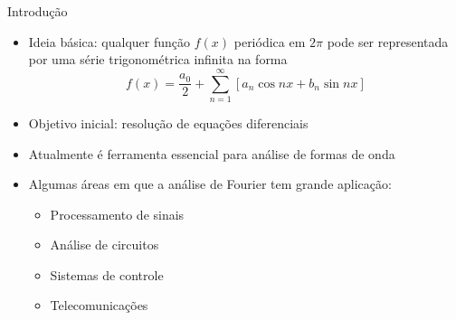       \begin{slide}[toc =]{Introdução}
	      \begin{itemize}
		      \item Ideia básica: qualquer função $f(x)$ periódica em $2\pi$ pode ser representada por uma série trigonométrica infinita na forma
			      \begin{equation*}
				      f(x) = \frac{a_0}{2}+ \sum_{n=1}^\infty \left [ a_n\cos nx + b_n\sin nx\right ]
			      \end{equation*}\pause	
		      \item Objetivo inicial: resolução de equações diferenciais\pause
		      \item Atualmente é ferramenta essencial para análise de formas de onda\pause
		      \item Algumas áreas em que a análise de Fourier tem grande aplicação:
			      \begin{itemize}
				      \item Processamento de sinais
				      \item Análise de circuitos
				      \item Sistemas de controle
				      \item Telecomunicações
			      \end{itemize}
	      \end{itemize}
      \end{slide}
      
